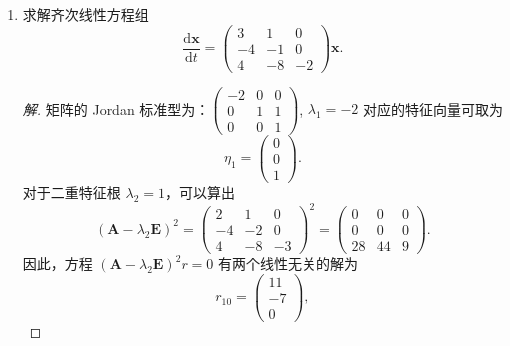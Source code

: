 \begin{enumerate}
\begin{proof}[解]
\begin{align*}
\begin{pmatrix}
\mathrm{e}^{-s} \cos s & \mathrm{e}^{-s} \sin s \\ \\
-\sin s & \cos s\end{pmatrix}\begin{pmatrix}\cos s \\ \\ \sin s\end{pmatrix} \mathrm{d} s\right] \\
& =\begin{pmatrix}(\mathrm{e}^{t}-1) \cos t-\sin t \\ \\(\mathrm{e}^{t}-1) \sin t+\cos t\end{pmatrix}.
\end{align*}
\end{proof}
\item 求解齐次线性方程组
\[\frac{\mathrm{d} \boldsymbol{x}}{\mathrm{d} t}
=\begin{pmatrix}3 & 1 & 0 \\-4 & -1 & 0 \\4 & -8 & -2\end{pmatrix} \boldsymbol{x}.\]
\begin{proof}[解]
矩阵的 Jordan 标准型为：$\begin{pmatrix}-2 & 0 & 0 \\ 0 & 1 & 1 \\ 0 & 0 & 1\end{pmatrix}$, 
$\lambda_{1}=-2$ 对应的特征向量可取为
\[\eta_{1}=\begin{pmatrix}0 \\0 \\1\end{pmatrix}.\]
对于二重特征根 $\lambda_{2}=1$，可以算出
\[(\boldsymbol{A}-\lambda_{2}\boldsymbol{E})^{2}
=\begin{pmatrix}
2 & 1 & 0 \\
-4 & -2 & 0 \\
4 & -8 & -3
\end{pmatrix}^{2}=\begin{pmatrix}
0 & 0 & 0 \\
0 & 0 & 0 \\
28 & 44 & 9
\end{pmatrix}.\]
因此，方程 $(\boldsymbol{A}-\lambda_{2}\boldsymbol{E})^{2}r=0$ 有两个线性无关的解为
\[r_{10}=\begin{pmatrix}11 \\-7 \\0\end{pmatrix}, 
\]
\end{proof}
\end{enumerate}
